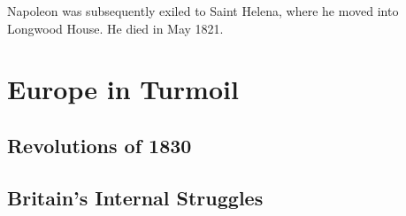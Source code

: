 Napoleon was subsequently exiled to Saint Helena, where he moved into Longwood House.
He died in May 1821.

\section{Europe in Turmoil}

\subsection*{Revolutions of 1830}

\subsection*{Britain's Internal Struggles}

